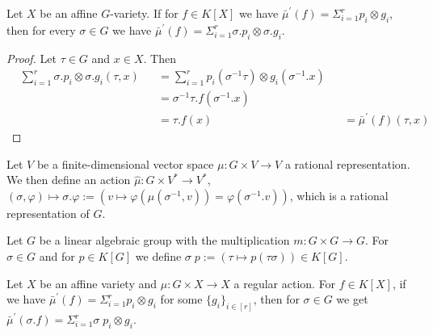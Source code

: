 \begin{proposition}\label{rara}
  Let $X$ be an affine $G$-variety.
  If for $f \in K[X]$ we have $\bar{\mu}^\prime (f) = \Sigma_{i =1}^r p_i \otimes g_i $, then for every $\sigma \in G$ we have $\bar{\mu}^\prime (f) = \Sigma_{i=1}^r \sigma.p_i \otimes \sigma.g_i$.
\end{proposition}

\begin{proof}
  Let $\tau \in G$ and $x \in X$.
  Then
  \begin{equation}
    \begin{aligned}
      &\sum_{i=1}^r \sigma.p_i \otimes \sigma.g_i (\tau,x)
      &&= \sum_{i=1}^r p_i(\sigma^{-1}\tau) \otimes g_i (\sigma^{-1}.x)  \\
      &&&= \sigma^{-1}\tau.f(\sigma^{-1}.x)  \\
      &&&= \tau.f(x) &&= \bar{\mu}^\prime (f) (\tau,x)
    \end{aligned}
  \end{equation}
\end{proof}

\begin{definition}\label{back}
  Let $V$ be a finite-dimensional vector space $\mu \colon G \times V \rightarrow V$ a rational representation.
  We then define an action $\hat{\mu} \colon G \times V^\ast \rightarrow V^\ast$, $ (\sigma,\varphi) \mapsto \sigma.\varphi := (v \mapsto \varphi(\mu(\sigma^{-1},v)) = \varphi(\sigma^{-1}.v))$, which is a rational representation of $G$.
\end{definition}

\begin{definition}\label{rac}
  Let $G$ be a linear algebraic group with the multiplication $m \colon G \times G \rightarrow G$.
  For $\sigma \in G$ and for $p \in K[G]$ we define $\sigma\dot{\phantom{.}}p := (\tau \mapsto p(\tau\sigma)) \in K[G]$.
\end{definition}

\begin{proposition}\label{roro}
  Let $X$ be an affine variety and $\mu \colon G \times X \rightarrow X$ a regular action.
  For $f \in K[X]$, if we have $\bar{\mu}^\prime (f) = \Sigma_{i = 1}^r p_i \otimes g_i$ for some $\{g_i\}_{i\in [r]}$, then for $\sigma \in G$ we get $\bar{\mu}^\prime (\sigma.f) = \Sigma_{i = 1}^r \sigma \dot{\phantom{.}} p_i \otimes g_i$.
\end{proposition}

